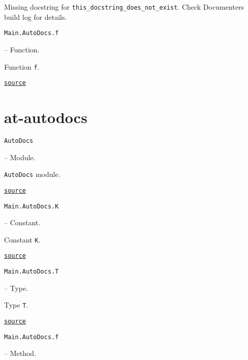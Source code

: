 \begin{tcolorbox}[colback=admonition-warning!5!white,colframe=admonition-warning!75!black,title=\textbf{Missing docstring.}]
Missing docstring for \texttt{this\_docstring\_does\_not\_exist}. Check Documenter{\textquotesingle}s build log for details.

\end{tcolorbox}

\hypertarget{5308965026370084775}{\texttt{Main.AutoDocs.f}}  -- {Function.}

\begin{adjustwidth}{2em}{0pt}

Function \texttt{f}.



\href{https://example.org/Repository.jl/blob/test/examples/make.jl#L85-85}{\texttt{source}}


\end{adjustwidth}

\section{at-autodocs}



\label{17848419264812669351}{}

\hypertarget{11302554442225637105}{\texttt{AutoDocs}}  -- {Module.}

\begin{adjustwidth}{2em}{0pt}

\texttt{AutoDocs} module.



\href{https://example.org/Repository.jl/blob/test/examples/make.jl#L75-75}{\texttt{source}}


\end{adjustwidth}
\hypertarget{15441025252371609530}{\texttt{Main.AutoDocs.K}}  -- {Constant.}

\begin{adjustwidth}{2em}{0pt}

Constant \texttt{K}.



\href{https://example.org/Repository.jl/blob/test/examples/make.jl#L88-88}{\texttt{source}}


\end{adjustwidth}
\hypertarget{12338358314596597808}{\texttt{Main.AutoDocs.T}}  -- {Type.}

\begin{adjustwidth}{2em}{0pt}

Type \texttt{T}.



\href{https://example.org/Repository.jl/blob/test/examples/make.jl#L91-91}{\texttt{source}}


\end{adjustwidth}
\hypertarget{14053004641171891989}{\texttt{Main.AutoDocs.f}}  -- {Method.}


